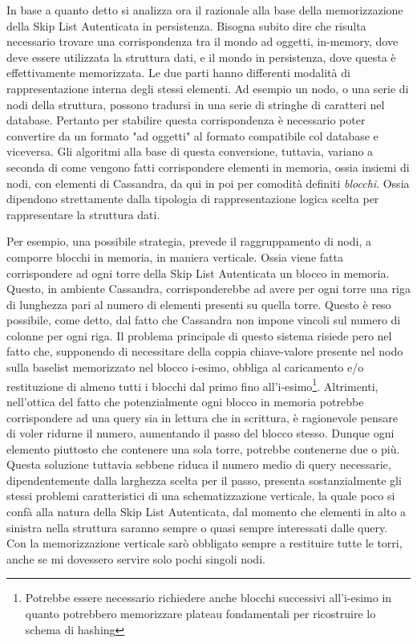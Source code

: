 
		In base a quanto detto si analizza ora il razionale alla base della memorizzazione della Skip List Autenticata in persistenza. Bisogna subito dire che risulta necessario trovare una corrispondenza tra il mondo ad oggetti, in-memory, dove deve essere utilizzata la struttura dati, e il mondo in persistenza, dove questa è effettivamente memorizzata. Le due parti hanno differenti modalità di rappresentazione interna degli stessi elementi. Ad esempio un nodo, o una serie di nodi della struttura, possono tradursi in una serie di stringhe di caratteri nel database. Pertanto per stabilire questa corrispondenza è necessario poter convertire da un formato "ad oggetti" al formato compatibile col database e viceversa.
		Gli algoritmi alla base di questa conversione, tuttavia, variano a seconda di come vengono fatti corrispondere elementi in memoria, ossia insiemi di nodi, con elementi di Cassandra, da qui in poi per comodità definiti \textit{blocchi}. Ossia dipendono strettamente dalla tipologia di rappresentazione logica scelta per rappresentare la struttura dati.
		
		Per esempio, una possibile strategia, prevede il raggruppamento di nodi, a comporre blocchi in memoria, in maniera verticale. Ossia viene fatta corrispondere ad ogni torre della Skip List Autenticata un blocco in memoria. Questo, in ambiente Cassandra, corrisponderebbe ad avere per ogni torre una riga di lunghezza pari al numero di elementi presenti su quella torre. Questo è reso possibile, come detto, dal fatto che Cassandra non impone vincoli sul numero di colonne per ogni riga.
		Il problema principale di questo sistema risiede pero nel fatto che, supponendo di necessitare della coppia chiave-valore presente nel nodo sulla baselist memorizzato nel blocco i-esimo, obbliga al caricamento e/o restituzione di almeno tutti i blocchi dal primo fino all'i-esimo\footnote{Potrebbe essere necessario richiedere anche blocchi successivi all'i-esimo in quanto potrebbero memorizzare plateau fondamentali per ricostruire lo schema di hashing}.
		Altrimenti, nell'ottica del fatto che potenzialmente ogni blocco in memoria potrebbe corrispondere ad una query sia in lettura che in scrittura, è ragionevole pensare di voler ridurne il numero, aumentando il passo del blocco stesso. Dunque ogni elemento piuttosto che contenere una sola torre, potrebbe contenerne due o più. Questa soluzione tuttavia sebbene riduca il numero medio di query necessarie, dipendentemente dalla larghezza scelta per il passo, presenta sostanzialmente gli stessi problemi caratteristici di una schematizzazione verticale, la quale poco si confà alla natura della Skip List Autenticata, dal momento che elementi in alto a sinistra nella struttura saranno sempre o quasi sempre interessati dalle query. Con la memorizzazione verticale sarò obbligato sempre a restituire tutte le torri, anche se mi dovessero servire solo pochi singoli nodi.
		
